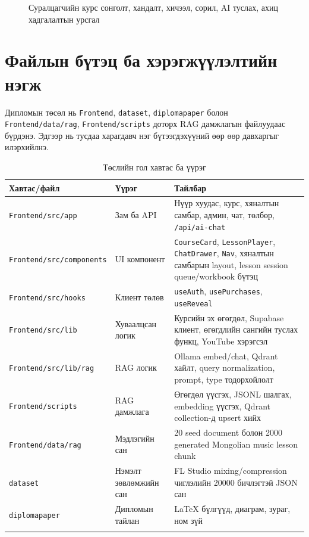 \begin{figure}[H]
  \centering
  \resizebox{0.82\textwidth}{!}{}
  \caption[Суралцагчийн үйл ажиллагааны урсгал]{Суралцагчийн курс сонголт, хандалт, хичээл, сорил, AI туслах, ахиц хадгалалтын урсгал}
  \label{fig:ch3-activity}
\end{figure}

\section{Файлын бүтэц ба хэрэгжүүлэлтийн нэгж}
Дипломын төсөл нь \texttt{Frontend}, \texttt{dataset}, \texttt{diplomapaper} болон \texttt{Frontend/data/rag}, \texttt{Frontend/scripts} доторх RAG дамжлагын файлуудаас бүрдэнэ. Эдгээр нь тусдаа харагдавч нэг бүтээгдэхүүний өөр өөр давхаргыг илэрхийлнэ.

\begin{longtable}{|p{}|p{}|p{}|}
  \hline
  \textbf{Хавтас/файл} & \textbf{Үүрэг} & \textbf{Тайлбар} \\ \hline
  \texttt{Frontend/src/app} & Зам ба API & Нүүр хуудас, курс, хяналтын самбар, админ, чат, төлбөр, \texttt{/api/ai-chat} \\ \hline
  \texttt{Frontend/src/components} & UI компонент & \texttt{CourseCard}, \texttt{LessonPlayer}, \texttt{ChatDrawer}, \texttt{Nav}, хяналтын самбарын layout, lesson session queue/workbook бүтэц \\ \hline
  \texttt{Frontend/src/hooks} & Клиент төлөв & \texttt{useAuth}, \texttt{usePurchases}, \texttt{useReveal} \\ \hline
  \texttt{Frontend/src/lib} & Хуваалцсан логик & Курсийн эх өгөгдөл, Supabase клиент, өгөгдлийн сангийн туслах функц, YouTube хэрэгсэл \\ \hline
  \texttt{Frontend/src/lib/rag} & RAG логик & Ollama embed/chat, Qdrant хайлт, query normalization, prompt, type тодорхойлолт \\ \hline
  \texttt{Frontend/scripts} & RAG дамжлага & Өгөгдөл үүсгэх, JSONL шалгах, embedding үүсгэх, Qdrant collection-д upsert хийх \\ \hline
  \texttt{Frontend/data/rag} & Мэдлэгийн сан & 20 seed document болон 2000 generated Mongolian music lesson chunk \\ \hline
  \texttt{dataset} & Нэмэлт зөвлөмжийн сан & FL Studio mixing/compression чиглэлийн 20000 бичлэгтэй JSON сан \\ \hline
  \texttt{diplomapaper} & Дипломын тайлан & LaTeX бүлгүүд, диаграм, зураг, ном зүй \\ \hline
  \caption{Төслийн гол хавтас ба үүрэг}
  \label{tab:ch3-project-folders}
\end{longtable}

